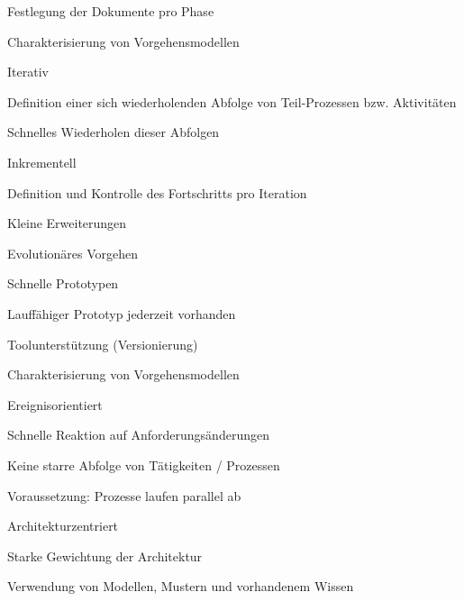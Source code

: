 \documentclass[a4paper]{article}
\begin{document}
\begin{multicols}{3}
\begin{itemize*}
\begin{itemize*}
\begin{itemize*}
        \item Festlegung der Dokumente pro Phase
      \end{itemize*}
    \end{itemize*}
    \item Charakterisierung von Vorgehensmodellen
    \begin{itemize*}
      \item Iterativ
      \begin{itemize*}
        \item Definition einer sich wiederholenden Abfolge von Teil-Prozessen bzw. Aktivitäten
        \item Schnelles Wiederholen dieser Abfolgen
      \end{itemize*}
      \item Inkrementell
      \begin{itemize*}
        \item Definition und Kontrolle des Fortschritts pro Iteration
        \item Kleine Erweiterungen
      \end{itemize*}
      \item Evolutionäres Vorgehen
      \begin{itemize*}
        \item Schnelle Prototypen
        \item Lauffähiger Prototyp jederzeit vorhanden
        \item Toolunterstützung (Versionierung)
      \end{itemize*}
    \end{itemize*}
    \item Charakterisierung von Vorgehensmodellen
    \begin{itemize*}
      \item Ereignisorientiert
      \begin{itemize*}
        \item Schnelle Reaktion auf Anforderungsänderungen
        \item Keine starre Abfolge von Tätigkeiten / Prozessen
        \item Voraussetzung: Prozesse laufen parallel ab
      \end{itemize*}
      \item Architekturzentriert
      \begin{itemize*}
        \item Starke Gewichtung der Architektur
        \item Verwendung von Modellen, Mustern und vorhandenem Wissen

\end{itemize*}
\end{itemize*}
\end{itemize*}
\end{multicols}
\end{document}
